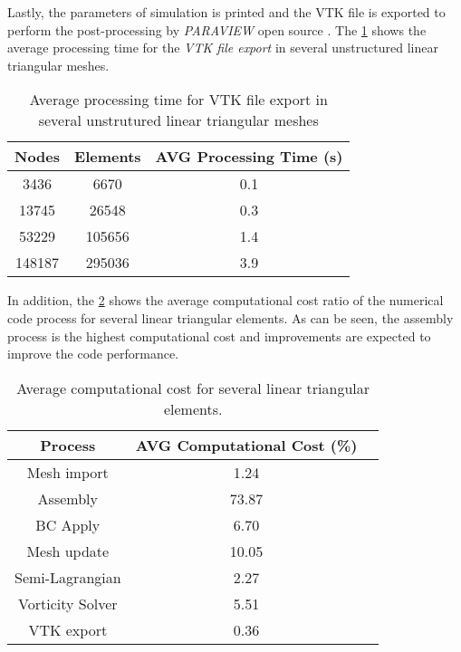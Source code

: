 \medskip
Lastly, the parameters of simulation is printed and
the VTK file is exported to perform the post-processing by
\textit{PARAVIEW} open source \cite{paraview}. 
The \ref{tempo export vtk} 
shows the average processing time for the \textit{VTK file export}
in several unstructured linear triangular meshes.

\vspace{0.5cm}
\begin{table}[H]
\centering
\begin{tabular}{ccc}
\toprule
\textbf{Nodes} & \textbf{Elements} & \textbf{AVG Processing Time} (s) \\
\midrule
3436 & 6670 & 0.1 \\
13745 & 26548 & 0.3 \\
53229 & 105656 & 1.4 \\
148187 & 295036 & 3.9 \\



\bottomrule
\end{tabular}
\caption{Average processing time for VTK file export in several unstrutured linear triangular meshes}
\label{tempo export vtk}
\end{table}



\medskip
In addition, the \ref{time ratio} shows the average computational
cost ratio
of the numerical code process for several linear triangular elements. 
As can be seen,
the assembly process is the highest computational cost
and improvements are expected to improve the code performance.


\vspace{0.5cm}
\begin{table}[H]
\centering
\begin{tabular}{ccc}
\toprule
\textbf{Process} & \textbf{AVG Computational Cost} (\%) \\
\midrule
Mesh import & 1.24 \\
Assembly & 73.87 \\
BC Apply & 6.70 \\
Mesh update & 10.05 \\
Semi-Lagrangian & 2.27 \\
Vorticity Solver & 5.51 \\
VTK export & 0.36 \\
\bottomrule
\end{tabular}
\caption{Average computational cost for several linear triangular elements.}
\label{time ratio}
\end{table}


